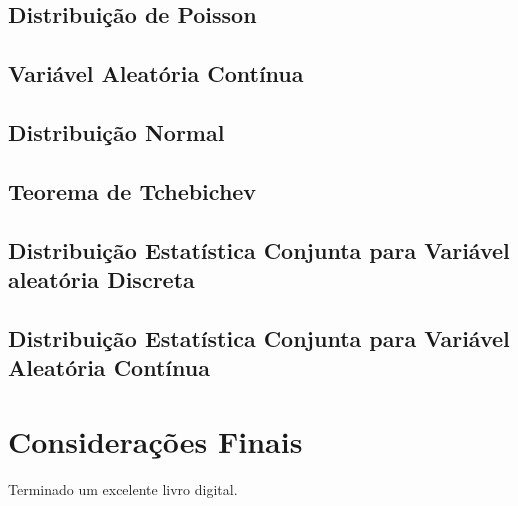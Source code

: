 \documentclass[
]{book}
\begin{document}
\hypertarget{distribuiuxe7uxe3o-de-poisson}{%
\section{Distribuição de Poisson}\label{distribuiuxe7uxe3o-de-poisson}}

\hypertarget{variuxe1vel-aleatuxf3ria-contuxednua}{%
\section{Variável Aleatória Contínua}\label{variuxe1vel-aleatuxf3ria-contuxednua}}

\hypertarget{distribuiuxe7uxe3o-normal}{%
\section{Distribuição Normal}\label{distribuiuxe7uxe3o-normal}}

\hypertarget{teorema-de-tchebichev}{%
\section{Teorema de Tchebichev}\label{teorema-de-tchebichev}}

\hypertarget{distribuiuxe7uxe3o-estatuxedstica-conjunta-para-variuxe1vel-aleatuxf3ria-discreta}{%
\section{Distribuição Estatística Conjunta para Variável aleatória Discreta}\label{distribuiuxe7uxe3o-estatuxedstica-conjunta-para-variuxe1vel-aleatuxf3ria-discreta}}

\hypertarget{distribuiuxe7uxe3o-estatuxedstica-conjunta-para-variuxe1vel-aleatuxf3ria-contuxednua}{%
\section{Distribuição Estatística Conjunta para Variável Aleatória Contínua}\label{distribuiuxe7uxe3o-estatuxedstica-conjunta-para-variuxe1vel-aleatuxf3ria-contuxednua}}

\hypertarget{considerauxe7uxf5es-finais}{%
\chapter{Considerações Finais}\label{considerauxe7uxf5es-finais}}

Terminado um excelente livro digital.

  
\end{document}
